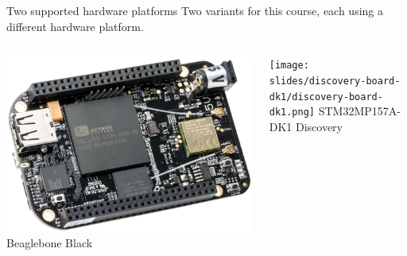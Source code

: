 \begin{frame}{Two supported hardware platforms}
  Two variants for this course, each using a different hardware
  platform.  \vfill
  \begin{columns}
    \begin{center}
      \includegraphics[height=0.4\textheight]{slides/beagleboneblack-board/beagleboneblack.png}
      \newline
      Beaglebone Black
    \end{center}
    \begin{center}
      \texttt{[image: slides/discovery-board-dk1/discovery-board-dk1.png]}
      \newline
      STM32MP157A-DK1 Discovery
    \end{center}
  \end{columns}
\end{frame}

